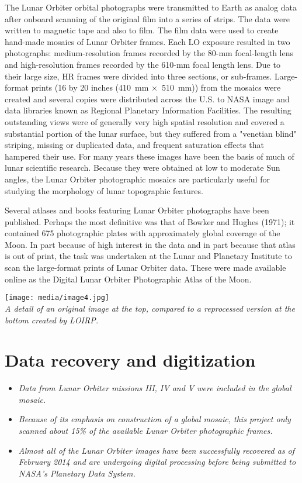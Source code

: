 The Lunar Orbiter orbital photographs were transmitted to Earth as
analog data after onboard scanning of the original film into a series of
strips. The data were written to magnetic tape and also to film. The
film data were used to create hand-made mosaics of Lunar Orbiter frames.
Each LO exposure resulted in two photographs: medium-resolution frames
recorded by the 80-mm focal-length lens and high-resolution frames
recorded by the 610-mm focal length lens. Due to their large size, HR
frames were divided into three sections, or sub-frames. Large-format
prints (16 by 20 inches (410~mm ×~510~mm)) from the mosaics were created
and several copies were distributed across the U.S. to NASA image and
data libraries known as Regional Planetary Information Facilities. The
resulting outstanding views were of generally very high spatial
resolution and covered a substantial portion of the lunar surface, but
they suffered from a "venetian blind" striping, missing or duplicated
data, and frequent saturation effects that hampered their use. For many
years these images have been the basis of much of lunar scientific
research. Because they were obtained at low to moderate Sun angles, the
Lunar Orbiter photographic mosaics are particularly useful for studying
the morphology of lunar topographic features.

Several atlases and books featuring Lunar Orbiter photographs have been
published. Perhaps the most definitive was that of Bowker and Hughes
(1971); it contained 675 photographic plates with approximately global
coverage of the Moon. In part because of high interest in the data and
in part because that atlas is out of print, the task was undertaken at
the Lunar and Planetary Institute to scan the large-format prints of
Lunar Orbiter data. These were made available online as the Digital
Lunar Orbiter Photographic Atlas of the Moon.

\texttt{[image: media/image4.jpg]}\\
\emph{A detail of an original image at the top, compared to a
reprocessed version at the bottom created by LOIRP.}

\section{Data recovery and
digitization}\label{data-recovery-and-digitization}

\begin{itemize}
\item
  \emph{Data from Lunar Orbiter missions III, IV and V were included in
  the global mosaic.}
\item
  \emph{Because of its emphasis on construction of a global mosaic, this
  project only scanned about 15\% of the available Lunar Orbiter
  photographic frames.}
\item
  \emph{Almost all of the Lunar Orbiter images have been successfully
  recovered as of February 2014 and are undergoing digital processing
  before being submitted to NASA's Planetary Data System.}
\end{itemize}


